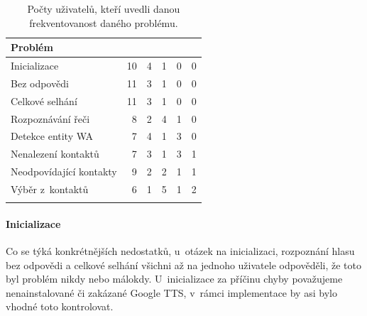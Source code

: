 \begin{table}[b!]

    \centering

    \begin{tabular}{l@{\hspace{1.5cm}}D{.}{,}{3.2}D{.}{,}{1.2}D{.}{,}{2.3}D{.}{,}{2.3}D{.}{,}{2.3}}
        \toprule
        \textbf{Problém}        &  &  &  &  &  \\
        \midrule
        Inicializace            & 10         & 4            & 1          & 0          & 0         \\
        Bez odpovědi            & 11         & 3            & 1          & 0          & 0         \\
        Celkové selhání         & 11         & 3            & 1          & 0          & 0         \\
        Rozpoznávání řeči       & 8          & 2            & 4          & 1          & 0         \\
        Detekce entity WA       & 7          & 4            & 1          & 3          & 0         \\
        Nenalezení kontaktů     & 7          & 3            & 1          & 3          & 1         \\
        Neodpovídající kontakty & 9          & 2            & 2          & 1          & 1         \\
        Výběr z~kontaktů        & 6          & 1            & 5          & 1          & 2         \\
        \bottomrule
    \end{tabular}

    \caption{Počty uživatelů, kteří uvedli danou frekventovanost daného problému.}\label{tab-results}

\end{table}

\paragraph{Inicializace} Co se týká konkrétnějších nedostatků, u~otázek na inicializaci, rozpoznání
hlasu bez odpovědi a celkové selhání všichni až na jednoho uživatele odpověděli,
že toto byl problém nikdy nebo málokdy. U~inicializace za příčinu
chyby považujeme nenainstalované či zakázané Google TTS, v~rámci
implementace by asi bylo vhodné toto kontrolovat.

